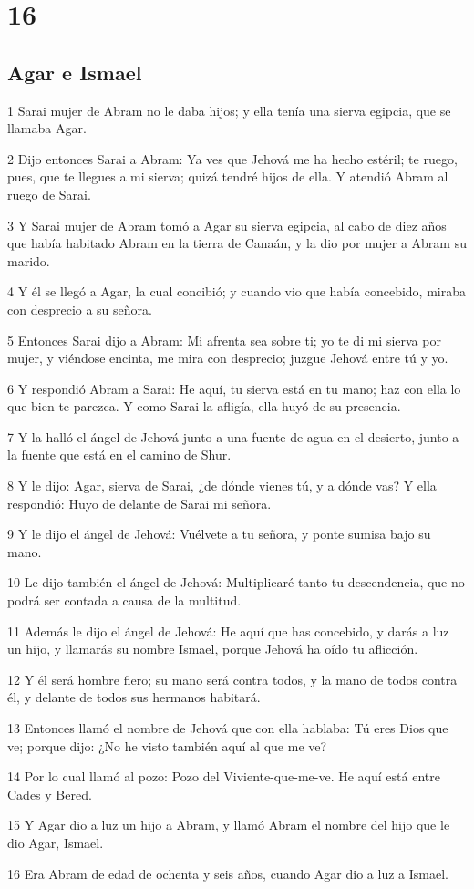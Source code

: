 \chapter{16}

\section*{Agar e Ismael}

\par 1 Sarai mujer de Abram no le daba hijos; y ella tenía una sierva egipcia, que se llamaba Agar.
\par 2 Dijo entonces Sarai a Abram: Ya ves que Jehová me ha hecho estéril; te ruego, pues, que te llegues a mi sierva; quizá tendré hijos de ella. Y atendió Abram al ruego de Sarai.
\par 3 Y Sarai mujer de Abram tomó a Agar su sierva egipcia, al cabo de diez años que había habitado Abram en la tierra de Canaán, y la dio por mujer a Abram su marido.
\par 4 Y él se llegó a Agar, la cual concibió; y cuando vio que había concebido, miraba con desprecio a su señora.
\par 5 Entonces Sarai dijo a Abram: Mi afrenta sea sobre ti; yo te di mi sierva por mujer, y viéndose encinta, me mira con desprecio; juzgue Jehová entre tú y yo.
\par 6 Y respondió Abram a Sarai: He aquí, tu sierva está en tu mano; haz con ella lo que bien te parezca. Y como Sarai la afligía, ella huyó de su presencia.
\par 7 Y la halló el ángel de Jehová junto a una fuente de agua en el desierto, junto a la fuente que está en el camino de Shur.
\par 8 Y le dijo: Agar, sierva de Sarai, ¿de dónde vienes tú, y a dónde vas? Y ella respondió: Huyo de delante de Sarai mi señora.
\par 9 Y le dijo el ángel de Jehová: Vuélvete a tu señora, y ponte sumisa bajo su mano.
\par 10 Le dijo también el ángel de Jehová: Multiplicaré tanto tu descendencia, que no podrá ser contada a causa de la multitud.
\par 11 Además le dijo el ángel de Jehová: He aquí que has concebido, y darás a luz un hijo, y llamarás su nombre Ismael, porque Jehová ha oído tu aflicción.
\par 12 Y él será hombre fiero; su mano será contra todos, y la mano de todos contra él, y delante de todos sus hermanos habitará.
\par 13 Entonces llamó el nombre de Jehová que con ella hablaba: Tú eres Dios que ve; porque dijo: ¿No he visto también aquí al que me ve?
\par 14 Por lo cual llamó al pozo: Pozo del Viviente-que-me-ve. He aquí está entre Cades y Bered.
\par 15 Y Agar dio a luz un hijo a Abram, y llamó Abram el nombre del hijo que le dio Agar, Ismael.
\par 16 Era Abram de edad de ochenta y seis años, cuando Agar dio a luz a Ismael.

